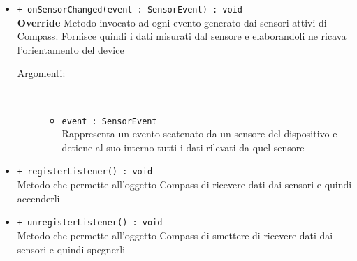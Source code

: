 \documentclass[../DefinizioneDiProdotto.tex]{subfiles}
\begin{document}
\begin{description}
\begin{itemize}
\begin{description}
		\end{description}
		\item \texttt{+ onSensorChanged(event : SensorEvent) : void}\\
		\textbf{Override} Metodo invocato ad ogni evento generato dai sensori attivi di Compass. Fornisce quindi i dati misurati dal sensore e elaborandoli ne ricava l'orientamento del device
		\begin{description}
			\item[Argomenti:] \
			\begin{itemize}
				\item \texttt{event : SensorEvent}\\
				Rappresenta un evento scatenato da un sensore del dispositivo e detiene al suo interno tutti i dati rilevati da quel sensore\end{itemize}
		\end{description}
		\item \texttt{+ registerListener() : void}\\
		Metodo che permette all'oggetto Compass di ricevere dati dai sensori e quindi accenderli
		\item \texttt{+ unregisterListener() : void}\\
		Metodo che permette all'oggetto Compass di smettere di ricevere dati dai sensori e quindi spegnerli
	\end{itemize}
\end{description}
\end{document}

